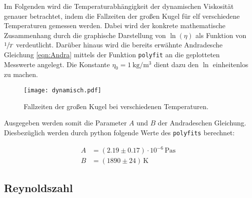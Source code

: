 \noindent
Im Folgenden wird die Temperaturabhängigkeit der dynamischen Viskosität genauer betrachtet, indem die Fallzeiten 
der großen Kugel für elf verschiedene Temperaturen gemessen werden. Dabei wird der konkrete mathematische Zusammenhang 
durch die graphische Darstellung von $\ln(\eta)$ als Funktion von $\sfrac{1}{T}$ verdeutlicht. Darüber hinaus wird die 
bereits erwähnte Andradesche Gleichung \eqref{eqn:Andra} mittels der Funktion \texttt{polyfit} an die geplotteten Messwerte 
angelegt. Die Konstante $\eta_0 = \qty{1}{\kilo \gram \per \cubic \meter}$ dient dazu den $\ln{}$ einheitenlos zu machen.

\begin{figure}[H]
    \centering
    \texttt{[image: dynamisch.pdf]}
    \caption{Fallzeiten der großen Kugel bei verschiedenen Temperaturen.}
\end{figure}

\noindent Ausgegeben werden somit die Parameter $A$ und $B$ der Andradeschen Gleichung. Diesbezüglich werden durch 
python folgende Werte des \texttt{polyfits} berechnet:

\begin{align*}
    A &= \left(2.19 \pm 0.17\right) \cdot 10^{-6}\,\unit{\pascal\second}\\
    B &= \left(1890 \pm 24\right)\,\unit{\kelvin}
\end{align*}

\subsection{Reynoldszahl}

